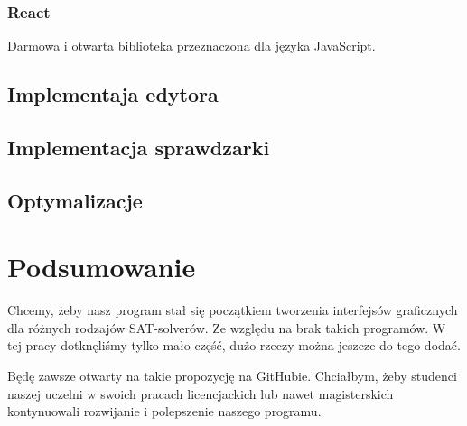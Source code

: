 \documentclass[a4paper,12pt,oneside]{book}
\theoremstyle{definition}
\begin{document}
\lipsum[1]

\lipsum[2]

\lipsum[3]

\subsection{React}

Darmowa i otwarta biblioteka przeznaczona dla języka JavaScript.

\lipsum[1]

\lipsum[2]

\lipsum[3]

\section{Implementaja edytora}

\lipsum[1]

\lipsum[2]

\lipsum[3]

\section{Implementacja sprawdzarki}

\lipsum[1]

\lipsum[2]

\lipsum[3]

\section{Optymalizacje}

\lipsum[1]

\lipsum[2]

\lipsum[3]

\lipsum[4]

\chapter*{Podsumowanie}

Chcemy, żeby nasz program stał się początkiem tworzenia interfejsów graficznych dla różnych rodzajów SAT-solverów. Ze względu na brak takich programów. W tej pracy dotknęliśmy tylko mało część, dużo rzeczy można jeszcze do tego dodać.

Będę \cite{einstein} zawsze otwarty na takie propozycję na GitHubie. Chciałbym, żeby \cite{dirac} studenci naszej uczelni w \cite{dirac} swoich pracach licencjackich lub \cite{knuthwebsite} nawet magisterskich \cite{knuth-fa} kontynuowali rozwijanie i polepszenie naszego programu.

\listoffigures{}

\printbibliography[title=Bibliografia]
\end{document}
